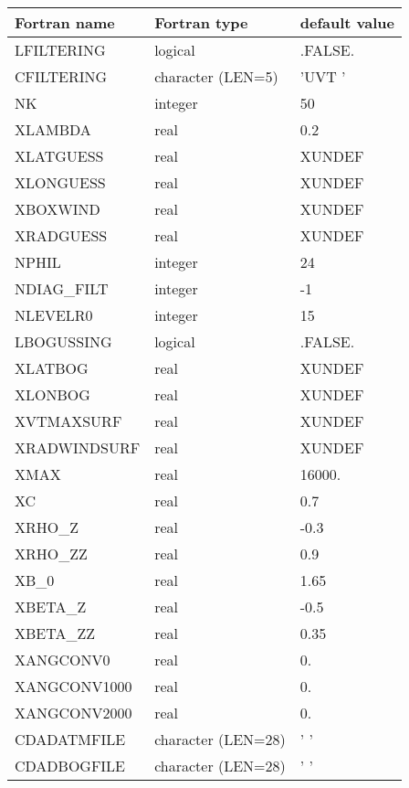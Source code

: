 \begin{longtable} {|p{}|p{}|p{}|}
\hline
Fortran name &  Fortran type & default value \\
\hline 
\endhead
\hline
\endfoot
LFILTERING     & logical  & .FALSE.    \\
CFILTERING     & character (LEN=5)  & 'UVT  '  \\
NK             & integer  & 50  \\
XLAMBDA        & real & 0.2     \\
XLATGUESS      & real & XUNDEF  \\
XLONGUESS      & real & XUNDEF  \\
XBOXWIND       & real & XUNDEF  \\
XRADGUESS      & real & XUNDEF  \\
NPHIL          & integer  & 24  \\
NDIAG\_FILT    & integer  & -1  \\
NLEVELR0       & integer  & 15  \\
\hline
LBOGUSSING     & logical    & .FALSE.   \\
XLATBOG        & real & XUNDEF  \\
XLONBOG        & real & XUNDEF  \\
XVTMAXSURF     & real & XUNDEF  \\
XRADWINDSURF   & real & XUNDEF  \\
XMAX           & real & 16000.  \\
XC             & real & 0.7  \\
XRHO\_Z        & real & -0.3  \\
XRHO\_ZZ       & real & 0.9   \\
XB\_0          & real & 1.65    \\
XBETA\_Z       & real & -0.5   \\
XBETA\_ZZ      & real & 0.35   \\
XANGCONV0      & real & 0.   \\
XANGCONV1000   & real & 0.   \\
XANGCONV2000   & real & 0.   \\
CDADATMFILE    & character (LEN=28) & ' '           \\
CDADBOGFILE    & character (LEN=28) & ' '           \\
\end{longtable}

